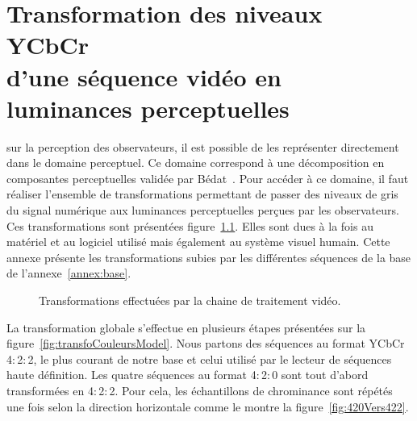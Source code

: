 \chapter[Transformation des niveaux YCbCr d'une séquence vidéo en luminances perceptuelles]{Transformation des niveaux YCbCr \\d'une séquence vidéo en luminances perceptuelles} \label{annex:transfo}
 sur la perception des observateurs, il est possible de les représenter directement dans le domaine perceptuel. Ce domaine correspond à une décomposition en composantes perceptuelles validée par Bédat~\cite{bedat-phd}. Pour accéder à ce domaine, il faut réaliser l'ensemble de transformations permettant de passer des niveaux de gris du signal numérique aux luminances perceptuelles perçues par les observateurs. Ces transformations sont présentées figure~\ref{fig:transfoCouleursAnnex}. Elles sont dues à la fois au matériel et au logiciel utilisé mais également au système visuel humain. Cette annexe présente les transformations subies par les différentes séquences de la base de l'annexe~\ref{annex:base}.

\begin{figure}[htbp]
	\centering
	\begin{tikzpicture}[node distance=3cm, text centered, text width=5em, minimum height=2em]\end{tikzpicture}
	\caption{Transformations effectuées par la chaine de traitement vidéo.}
	\label{fig:transfoCouleursAnnex}
\end{figure}

La transformation globale s'effectue en plusieurs étapes présentées sur la figure~\ref{fig:transfoCouleursModel}. Nous partons des séquences au format YCbCr 4$:$2$:$2, le plus courant de notre base et celui utilisé par le lecteur de séquences haute définition. Les quatre séquences au format 4$:$2$:$0 sont tout d'abord transformées en 4$:$2$:$2. Pour cela, les échantillons de chrominance sont répétés une fois selon la direction horizontale comme le montre la figure~\ref{fig:420Vers422}.


